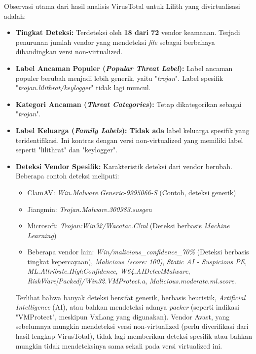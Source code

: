 Observasi utama dari hasil analisis VirusTotal untuk Lilith yang divirtualisasi adalah:
\begin{itemize}
    \item \textbf{Tingkat Deteksi:} Terdeteksi oleh \textbf{18 dari 72} vendor keamanan. Terjadi penurunan jumlah vendor yang mendeteksi \textit{file} sebagai berbahaya dibandingkan versi non-virtualized.
    \item \textbf{Label Ancaman Populer (\textit{Popular Threat Label}):} Label ancaman populer berubah menjadi lebih generik, yaitu "\textit{trojan}". Label spesifik "\textit{trojan.lilithrat/keylogger}" tidak lagi muncul.
    \item \textbf{Kategori Ancaman (\textit{Threat Categories}):} Tetap dikategorikan sebagai "\textit{trojan}".
    \item \textbf{Label Keluarga (\textit{Family Labels}):} \textbf{Tidak ada} label keluarga spesifik yang teridentifikasi. Ini kontras dengan versi non-virtualized yang memiliki label seperti "lilithrat" dan "keylogger".
    \item \textbf{Deteksi Vendor Spesifik:} Karakteristik deteksi dari vendor berubah. Beberapa contoh deteksi meliputi:
        \begin{itemize}
            \item ClamAV: \textit{Win.Malware.Generic-9995066-S} (Contoh, deteksi generik)
            \item Jiangmin: \textit{Trojan.Malware.300983.susgen}
            \item Microsoft: \textit{Trojan:Win32/Wacatac.C!ml} (Deteksi berbasis \textit{Machine Learning})
            \item Beberapa vendor lain: \textit{Win/malicious\_confidence\_70\%} (Deteksi berbasis tingkat kepercayaan), \textit{Malicious (score: 100)}, \textit{Static AI - Suspicious PE}, \textit{ML.Attribute.HighConfidence}, \textit{W64.AIDetectMalware}, \textit{RiskWare[Packed]/Win32.VMProtect.a}, \textit{Malicious.moderate.ml.score}.
        \end{itemize}
        Terlihat bahwa banyak deteksi bersifat generik, berbasis heuristik, \textit{Artificial Intelligence} (AI), atau bahkan mendeteksi adanya \textit{packer} (seperti indikasi "VMProtect", meskipun VxLang yang digunakan). Vendor Avast, yang sebelumnya mungkin mendeteksi versi non-virtualized (perlu diverifikasi dari hasil lengkap VirusTotal), tidak lagi memberikan deteksi spesifik atau bahkan mungkin tidak mendeteksinya sama sekali pada versi virtualized ini.
\end{itemize}

